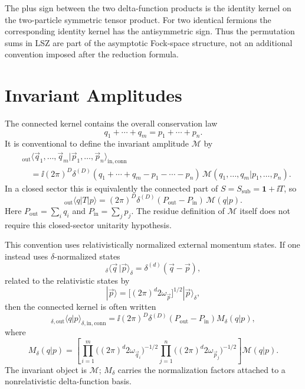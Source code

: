 \begin{remark}
The plus sign between the two delta-function products is the identity kernel
on the two-particle symmetric tensor product.  For two identical fermions the
corresponding identity kernel has the antisymmetric sign.  Thus the
permutation sums in LSZ are part of the asymptotic Fock-space structure, not
an additional convention imposed after the reduction formula.
\end{remark}

\section{Invariant Amplitudes}

\begin{definition}
\label{def:lsz-invariant-scalar-amplitude-convention}
The connected kernel contains the overall conservation law
\[
  q_1+\cdots+q_m=p_1+\cdots+p_n.
\]
It is conventional to define the invariant amplitude \(\mathcal M\) by
\[
\begin{aligned}
&{}_{\mathrm{out}}\langle
  \vec q_1,\ldots,\vec q_m
  |\vec p_1,\ldots,\vec p_n
  \rangle_{\mathrm{in,conn}}
\\
&\quad =
  \ii(2\pi)^D
  \delta^{(D)}(q_1+\cdots+q_m-p_1-\cdots-p_n)\,
  \mathcal M(q_1,\ldots,q_m|p_1,\ldots,p_n).
\end{aligned}
\]
In a closed sector this is equivalently the connected part of
\(S=S_{\mathrm{sub}}=\mathbf 1+\ii T\), so
\[
  {}_{\mathrm{out}}\langle q|T|p\rangle
  =
  (2\pi)^D\delta^{(D)}(P_{\mathrm{out}}-P_{\mathrm{in}})\,
  \mathcal M(q|p).
\]
Here \(P_{\mathrm{out}}=\sum_i q_i\) and
\(P_{\mathrm{in}}=\sum_j p_j\).  The residue definition of
\(\mathcal M\) itself does not require this closed-sector unitarity
hypothesis.

This convention uses relativistically normalized external momentum states.  If
one instead uses \(\delta\)-normalized states
\[
  {}_\delta\langle \vec q\,|\vec p\rangle_\delta
  =
  \delta^{(d)}(\vec q-\vec p),
\]
related to the relativistic states by
\[
  |\vec p\rangle
  =
  \bigl[(2\pi)^d2\omega_{\vec p}\bigr]^{1/2}
  |\vec p\rangle_\delta ,
\]
then the connected kernel is often written
\[
  {}_{\delta,\mathrm{out}}\langle q|p\rangle_{\delta,\mathrm{in,conn}}
  =
  \ii(2\pi)^D\delta^{(D)}(P_{\mathrm{out}}-P_{\mathrm{in}})
  M_\delta(q|p),
\]
where
\[
  M_\delta(q|p)
  =
  \left[
  \prod_{i=1}^{m}
  \bigl((2\pi)^d2\omega_{\vec q_i}\bigr)^{-1/2}
  \prod_{j=1}^{n}
  \bigl((2\pi)^d2\omega_{\vec p_j}\bigr)^{-1/2}
  \right]
  \mathcal M(q|p).
\]
The invariant object is \(\mathcal M\); \(M_\delta\) carries the normalization
factors attached to a nonrelativistic delta-function basis.
\end{definition}

